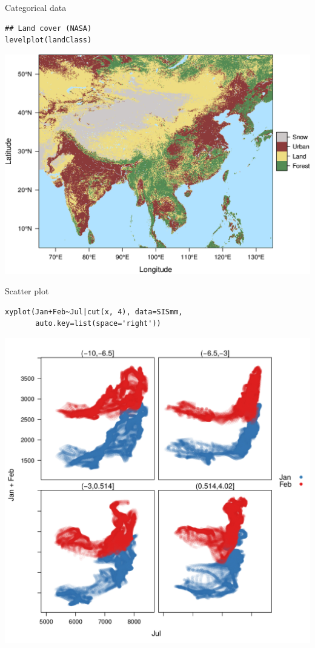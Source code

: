\documentclass[xcolor={usenames,svgnames,dvipsnames}]{beamer}
\begin{document}
\begin{frame}[fragile,label=sec-12]{Categorical data}
 \lstset{language=R,numbers=none}
\begin{lstlisting}
## Land cover (NASA)
levelplot(landClass)
\end{lstlisting}

\begin{center}
\includegraphics[height=0.65\textheight]{figs/landClass.png}
\end{center}
\end{frame}
\begin{frame}[fragile,label=sec-13]{Scatter plot}
 \lstset{language=R,numbers=none}
\begin{lstlisting}
xyplot(Jan+Feb~Jul|cut(x, 4), data=SISmm,
       auto.key=list(space='right'))
\end{lstlisting}

\begin{center}
\includegraphics[height=0.65\textheight]{figs/xyplot_formula.png}
\end{center}
\end{frame}
\end{document}
